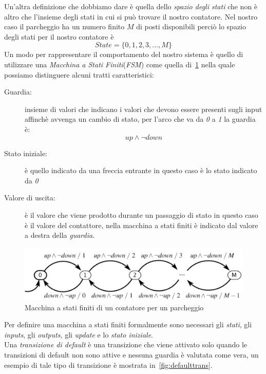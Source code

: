Un'altra definizione che dobbiamo dare è quella dello \emph{spazio degli stati} che non è altro che l'insieme degli stati in cui si può trovare il nostro contatore. Nel nostro caso il parcheggio ha un numero finito $M$ di posti disponibili perciò lo spazio degli stati per il nostro contatore è
$$State = \{0,1,2,3,\dots,M\}$$
Un modo per rappresentare il comportamento del nostro sistema è quello di utilizzare una \emph{Macchina a Stati Finiti}(\emph{FSM}) come quella di \figurename\,\ref{fig:parkfsm} nella quale possiamo distinguere alcuni tratti caratteristici:
\begin{description}
\item[Guardia:] insieme di valori che indicano i valori che devono essere presenti sugli input affinchè avvenga un cambio di stato, per l'arco che va da \emph{0} a \emph{1} la guardia è:
$$up \wedge \neg down $$ 
\item[Stato iniziale:] è quello indicato da una freccia entrante in questo caso è lo stato indicato da \emph{0}
\item[Valore di uscita:] è il valore che viene prodotto durante un passaggio di stato in questo caso è il valore del contattore, nella macchina a stati finiti è indicato dal valore a destra della \emph{guardia.}
\end{description}
\begin{figure}
\centering
\includegraphics[scale=0.4]{img/parkfsm.png}
\caption{Macchina a stati finiti di un contatore per un parcheggio}\label{fig:parkfsm}
\end{figure}
Per definire una macchina a stati finiti formalmente sono necessari gli \emph{stati}, gli \emph{inputs}, gli \emph{outputs}, gli \emph{update} e lo \emph{stato iniziale}.\\
Una \emph{transizione di default} è una transizione che viene attivato solo quando le transizioni di default non sono attive e nessuna guardia è valutata come vera, un esempio di tale tipo di transizione è mostrata in \figurename\,\ref{fig:defaulttrans}.\\
